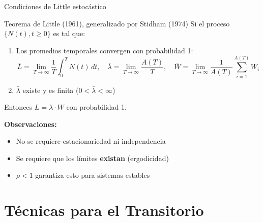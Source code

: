 \documentclass[aspectratio=1610, 9pt]{beamer}
\begin{document}
\begin{frame}{Condiciones de Little estocástico}

\begin{block}{Teorema de Little (1961), generalizado por Stidham (1974)}
Si el proceso $\{N(t), t \geq 0\}$ es tal que:
\begin{enumerate}
    \item Los promedios temporales convergen con probabilidad 1:
    \[
    \bar{L} = \lim_{T\to\infty} \frac{1}{T}\int_0^T N(t)\,dt, \quad \bar{\lambda} = \lim_{T\to\infty}\frac{A(T)}{T}, \quad \bar{W} = \lim_{T\to\infty}\frac{1}{A(T)}\sum_{i=1}^{A(T)} W_i
    \]
    \item $\bar{\lambda}$ existe y es finita ($0 < \bar{\lambda} < \infty$)
\end{enumerate}
Entonces $L = \lambda \cdot W$ con probabilidad 1.
\end{block}

\vspace{0.3cm}
\textbf{Observaciones:}
\begin{itemize}
    \item No se requiere estacionariedad ni independencia
    \item Se requiere que los límites \textbf{existan} (ergodicidad)
    \item $\rho < 1$ garantiza esto para sistemas estables
\end{itemize}
\end{frame}

\section{Técnicas para el Transitorio}
\end{document}
